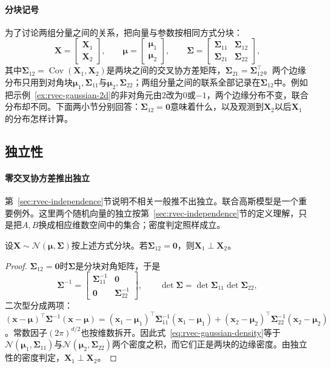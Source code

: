 \paragraph{分块记号}
为了讨论两组分量之间的关系，把向量与参数按相同方式分块：
\[
 \bm X=\begin{bmatrix}\bm X_1\\\bm X_2\end{bmatrix},\qquad
 \bm\mu=\begin{bmatrix}\bm\mu_1\\\bm\mu_2\end{bmatrix},\qquad
 \bm\Sigma=\begin{bmatrix}\bm\Sigma_{11}&\bm\Sigma_{12}\\\bm\Sigma_{21}&\bm\Sigma_{22}\end{bmatrix},
\]
其中$\bm\Sigma_{12}=\operatorname{Cov}(\bm X_1,\bm X_2)$是两块之间的交叉协方差矩阵，$\bm\Sigma_{21}=\bm\Sigma_{12}^{\top}$。两个边缘分布只用到对角块$\bm\mu_1,\bm\Sigma_{11}$与$\bm\mu_2,\bm\Sigma_{22}$；两组分量之间的联系全部记录在$\bm\Sigma_{12}$中。例如把示例~\ref{ex:rvec-gaussian-2d}的非对角元由$2$改为$0$或$-1$，两个边缘分布不变，联合分布却不同。下面两小节分别回答：$\bm\Sigma_{12}=\bm0$意味着什么，以及观测到$\bm X_2$以后$\bm X_1$的分布怎样计算。

\subsection{独立性}

\paragraph{零交叉协方差推出独立}
第~\ref{sec:rvec-independence}节说明不相关一般推不出独立。联合高斯模型是一个重要例外。这里两个随机向量的独立按第~\ref{sec:rvec-independence}节的定义理解，只是把$A,B$换成相应维数空间中的集合；密度判定照样成立。

\begin{theorem}[联合高斯向量的分块独立]
\label{thm:rvec-gaussian-independence}
设$\bm X\sim\mathcal N(\bm\mu,\bm\Sigma)$按上述方式分块。若$\bm\Sigma_{12}=\bm0$，则$\bm X_1\perp\bm X_2$。
\end{theorem}

\begin{proof}
$\bm\Sigma_{12}=\bm0$时$\bm\Sigma$是分块对角矩阵，于是
\[
 \bm\Sigma^{-1}=\begin{bmatrix}\bm\Sigma_{11}^{-1}&\bm0\\\bm0&\bm\Sigma_{22}^{-1}\end{bmatrix},\qquad
 \det\bm\Sigma=\det\bm\Sigma_{11}\det\bm\Sigma_{22},
\]
二次型分成两项：$(\bm x-\bm\mu)^{\top}\bm\Sigma^{-1}(\bm x-\bm\mu)=(\bm x_1-\bm\mu_1)^{\top}\bm\Sigma_{11}^{-1}(\bm x_1-\bm\mu_1)+(\bm x_2-\bm\mu_2)^{\top}\bm\Sigma_{22}^{-1}(\bm x_2-\bm\mu_2)$。常数因子$(2\pi)^{d/2}$也按维数拆开。因此式~\eqref{eq:rvec-gaussian-density}等于$\mathcal N(\bm\mu_1,\bm\Sigma_{11})$与$\mathcal N(\bm\mu_2,\bm\Sigma_{22})$两个密度之积，而它们正是两块的边缘密度。由独立性的密度判定，$\bm X_1\perp\bm X_2$。
\end{proof}

